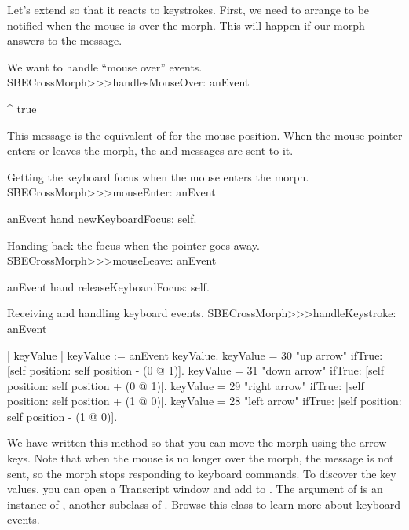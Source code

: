 \documentclass[a4paper,10pt,twoside]{book}
\begin{document}
Let's extend  so that it reacts to keystrokes.
First, we need to arrange to be notified when the mouse is over the morph.
This will happen if our morph answers  to the  message.

\begin{method}{We want to handle ``mouse over'' events.}
SBECrossMorph>>>handlesMouseOver: anEvent

	^ true
\end{method}

\noindent
This message is the equivalent of  for the mouse position.
When the mouse pointer enters or leaves the morph, the  and  messages are sent to it.

\begin{method}{Getting the keyboard focus when the mouse enters the morph.}
SBECrossMorph>>>mouseEnter: anEvent

	anEvent hand newKeyboardFocus: self.
\end{method}

\begin{method}{Handing back the focus when the pointer goes away.}
SBECrossMorph>>>mouseLeave: anEvent

	anEvent hand releaseKeyboardFocus: self.
\end{method}

\begin{method}[handleKeystroke]{Receiving and handling keyboard events.}
SBECrossMorph>>>handleKeystroke: anEvent

	| keyValue |
	keyValue := anEvent keyValue.
	keyValue = 30	 "up arrow"
		ifTrue: [self position: self position - (0 @ 1)].
	keyValue = 31	 "down arrow"
		ifTrue: [self position: self position + (0 @ 1)].
	keyValue = 29	 "right arrow"
		ifTrue: [self position: self position + (1 @ 0)].
	keyValue = 28	 "left arrow"
		ifTrue: [self position: self position - (1 @ 0)].
\end{method}

We have written this method so that you can move the morph using the arrow keys.
Note that when the mouse is no longer over the morph, the  message is not sent, so the morph stops responding to keyboard commands.
To discover the key values, you can open a Transcript window and add   to .
The  argument of  is an instance of , another subclass of . Browse this class to learn more about keyboard events.
\end{document}

